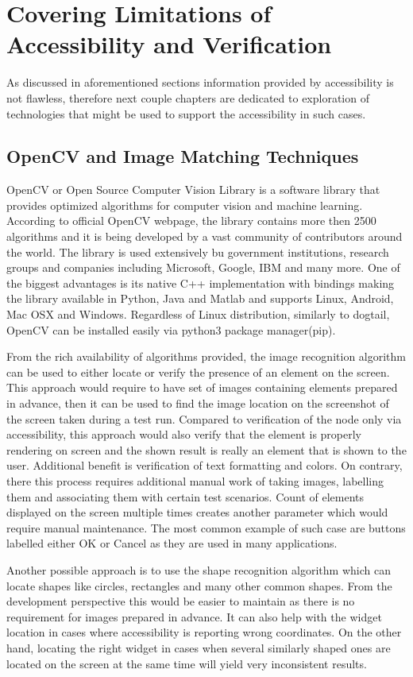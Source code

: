 \section{Covering Limitations of Accessibility and Verification}
As discussed in aforementioned sections information provided by accessibility is not flawless, therefore next couple chapters are dedicated to exploration of technologies that might be used to support the accessibility in such cases.

\subsection{OpenCV and Image Matching Techniques}
OpenCV or Open Source Computer Vision Library is a software library that provides optimized algorithms for computer vision and machine learning. According to official OpenCV webpage\cite{opencv}, the library contains more then 2500 algorithms and it is being developed 
by a vast community of contributors around the world. The library is used extensively bu government institutions, research groups and companies including Microsoft, Google, IBM and many more. One of the biggest advantages is its native C++ implementation with bindings making the library available in Python, Java and Matlab and supports Linux, Android, Mac OSX and Windows. Regardless of Linux distribution, similarly to dogtail, OpenCV can be installed easily via python3 package manager(pip). 

From the rich availability of algorithms provided, the image recognition algorithm can be used to either locate or verify the presence of an element on the screen. This approach would require to have set of images containing elements prepared in advance, then it can be used to find the image location on the screenshot of the screen taken during a test run. Compared to verification of the node only via accessibility, this approach would also verify that the element is properly rendering on screen and the shown result is really an element that is shown to the user. Additional benefit is verification of text formatting and colors. On contrary, there this process requires additional manual work of taking images, labelling them and associating them with certain test scenarios. Count of elements displayed on the screen multiple times creates another parameter which would require manual maintenance. The most common example of such case are buttons labelled either OK or Cancel as they are used in many applications.

Another possible approach is to use the shape recognition algorithm which can locate shapes like circles, rectangles and many other common shapes. From the development perspective this would be easier to maintain as there is no requirement for images prepared in advance. It can also help with the widget location in cases where accessibility is reporting wrong coordinates. On the other hand, locating the right widget in cases when several similarly shaped ones are located on the screen at the same time will yield very inconsistent results.


